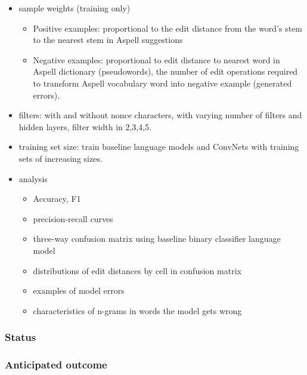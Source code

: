 \begin{itemize}
\begin{itemize}
        \item sample weights (training only)
        \begin{itemize}
            \item Positive examples: proportional to the edit distance from the word's stem to the nearest stem in Aspell suggestions
            \item Negative examples: proportional to edit distance to nearest word in Aspell dictionary (pseudowords), the number of edit operations required to transform Aspell vocabulary word into negative example (generated errors).
        \end{itemize}
        \item filters: with and without nonce characters, with varying number of filters and hidden layers, filter width in 2,3,4,5.
        \item training set size: train baseline language models and ConvNets with training sets of increasing sizes. 
    \item analysis
    \begin{itemize}
        \item Accuracy, F1
        \item precision-recall curves
        \item three-way confusion matrix using baseline binary classifier language model
        \item distributions of edit distances by cell in confusion matrix
        \item examples of model errors
        \item characteristics of n-grams in words the model gets wrong
    \end{itemize}
    \end{itemize}
\end{itemize}

\subsubsection{Status}



\subsubsection{Anticipated outcome}

